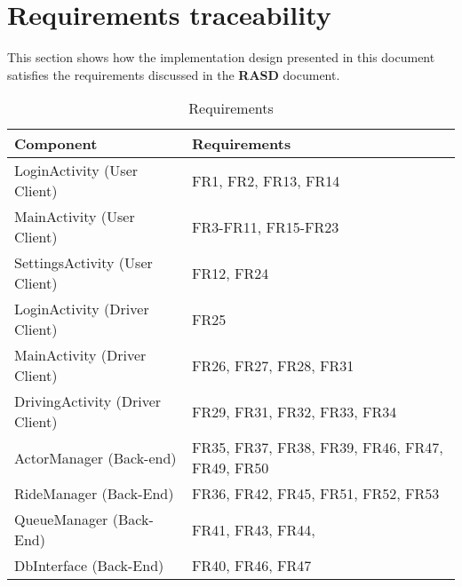 \section{Requirements traceability} %
This section shows how the implementation design presented in this document satisfies the requirements discussed in the \textbf{RASD} document.\\


\begin{table}[!h]
\centering
\caption{Requirements}
\begin{tabular}{|l|l|}
\hline
\textbf{Component}              & \textbf{Requirements}                          \\ \hline
LoginActivity (User Client)     & FR1,  FR2, FR13, FR14                          \\ \hline
MainActivity (User Client)      & FR3-FR11, FR15-FR23                            \\ \hline
SettingsActivity (User Client)  & FR12, FR24                                     \\ \hline
LoginActivity (Driver Client)   & FR25                                           \\ \hline
MainActivity (Driver Client)    & FR26, FR27, FR28, FR31                         \\ \hline
DrivingActivity (Driver Client) & FR29, FR31, FR32, FR33, FR34                   \\ \hline
ActorManager (Back-end)         & FR35, FR37, FR38, FR39, FR46, FR47, FR49, FR50 \\ \hline
RideManager (Back-End)          & FR36, FR42, FR45, FR51, FR52, FR53             \\ \hline
QueueManager (Back-End)         & FR41, FR43, FR44,                              \\ \hline
DbInterface (Back-End)          & FR40, FR46, FR47                               \\ \hline
\end{tabular}
\end{table}

